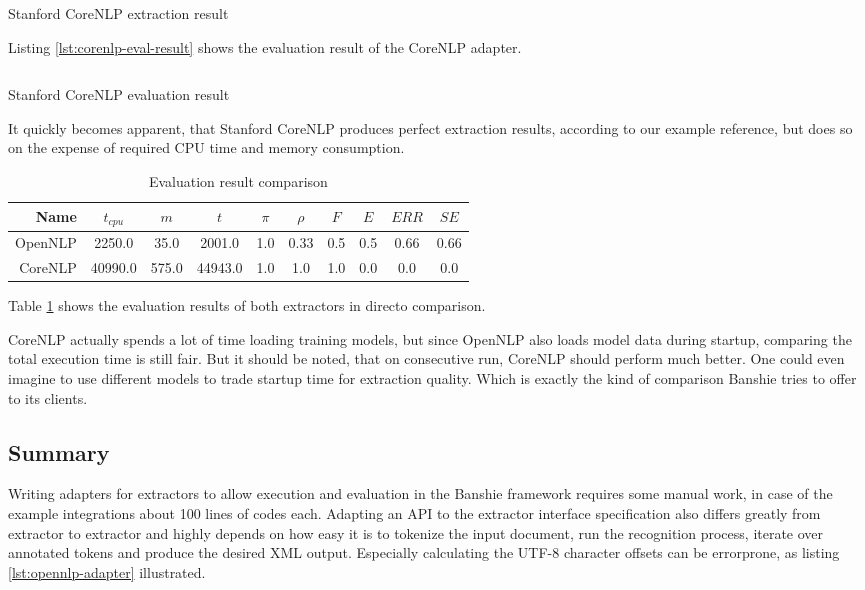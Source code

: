 \begin{listing}[H]
\inputminted{xml}{corenlp.xml}
\caption{Stanford CoreNLP extraction result}
\label{lst:corenlp-result}
\end{listing}

\newpage
Listing \ref{lst:corenlp-eval-result} shows the evaluation result of the CoreNLP adapter.

\begin{listing}[H]
\inputminted{java}{corenlp.txt}
\caption{Stanford CoreNLP evaluation result}
\label{lst:corenlp-eval-result}
\end{listing}

It quickly becomes apparent, that Stanford CoreNLP produces perfect extraction results, according to our example reference, but does so on the expense of required CPU time and memory consumption. 

\begin{table}[H]
\centering
\begin{tabular*}{\textwidth}{rccccccccc}
	\toprule
	Name & $t_{cpu}$ & $m$ & $t$ & $\pi$ & $\rho$ & $F$ & $E$ & $ERR$ & $SE$ \\
	\midrule
	OpenNLP & 2250.0 & 35.0 & 2001.0 & 1.0 & 0.33 & 0.5 & 0.5 & 0.66 & 0.66 \\ 
	CoreNLP & 40990.0 & 575.0 & 44943.0 & 1.0 & 1.0 & 1.0 & 0.0 & 0.0 & 0.0 \\
	\bottomrule
\end{tabular*}
\caption{Evaluation result comparison}
\label{tbl:result-comparison}
\end{table}

Table \ref{tbl:result-comparison} shows the evaluation results of both extractors in directo comparison.

CoreNLP actually spends a lot of time loading training models, but since OpenNLP also loads model data during startup, comparing the total execution time is still fair. But it should be noted, that on consecutive run, CoreNLP should perform much better. One could even imagine to use different models to trade startup time for extraction quality. Which is exactly the kind of comparison Banshie tries to offer to its clients.

\newpage
\subsection{Summary}
Writing adapters for extractors to allow execution and evaluation in the Banshie framework requires some manual work, in case of the example integrations about 100 lines of codes each. Adapting an \gls{API} to the extractor interface specification also differs greatly from extractor to extractor and highly depends on how easy it is to tokenize the input document, run the recognition process, iterate over annotated tokens and produce the desired \gls{XML} output. Especially calculating the UTF-8 character offsets can be errorprone, as listing \ref{lst:opennlp-adapter} illustrated.

